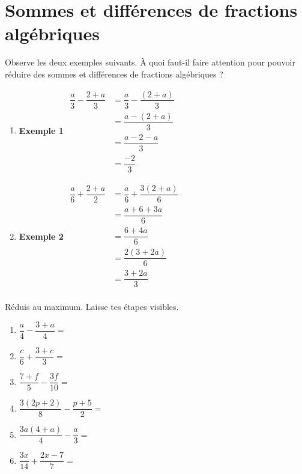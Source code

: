 \documentclass[../../syllabus_2.tex]{subfiles}
\begin{document}
\section{Sommes et différences de fractions algébriques}
  Observe les deux exemples suivants. À quoi faut-il faire attention pour pouvoir réduire des sommes et différences de fractions algébriques ? \\
  \begin{enumerate}[cols=2, label=]
    \item 
    \textbf{Exemple 1}
    \medbreak
      $\begin{aligned}
      \dfrac{a}{3} - \dfrac{2+a}{3} 
      &= \dfrac{a}{3} - \dfrac{\left(2+a\right)}{3}\\
      &= \dfrac{a-\left(2+a\right)}{3}\\
      &= \dfrac{a-2-a}{3}\\
      &= \dfrac{-2}{3}
    \end{aligned}$
    \vspace{3cm}
    \item   
    \textbf{Exemple 2}
    \medbreak
      $\begin{aligned}
      \dfrac{a}{6} + \dfrac{2+a}{2} 
      &= \dfrac{a}{6} + \dfrac{3\left(2+a\right)}{6}\\
      &= \dfrac{a+6+3a}{6}\\
      &= \dfrac{6+4a}{6} \\
      &= \dfrac{2(3+2a)}{6}\\
      &= \dfrac{3+2a}{3} \\
    \end{aligned}$
  \end{enumerate}

  \newpage
\begin{exercise}
  Réduis au maximum. Laisse tes étapes visibles.
  \begin{enumerate}[cols=2, itemsep=6cm]
    \item  $\dfrac{a}{4}-\dfrac{3+a}{4}=$
    \item  $\dfrac{c}{6} + \dfrac{3+c}{3}=$
    \item  $\dfrac{7+f}{5}-\dfrac{3f}{10}=$
    \item  $\dfrac{3(2p+2)}{8} - \dfrac{p+5}{2}=$
    \item $\dfrac{3a(4+a)}{4} - \dfrac{a}{3}=$
    \item $\dfrac{3x}{14} + \dfrac{2x-7}{7}=$
  \end{enumerate}
\end{exercise}
\end{document}
